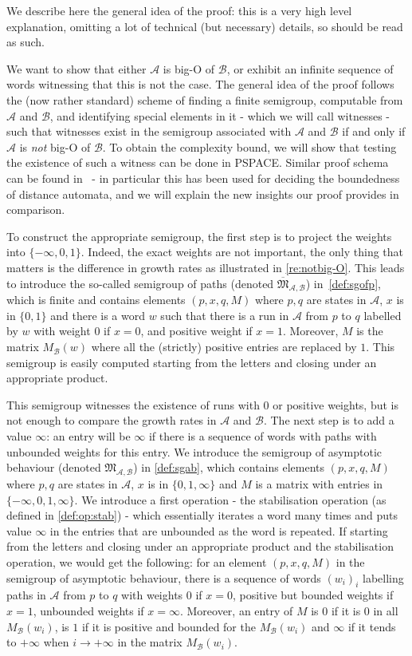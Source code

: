 \documentclass[10pt,a4paper]{amsart}
\theoremstyle{definition}
\numberwithin{equation}{section}
\theoremstyle{remark}
\newcommand{\ideal}{\mathfrak{M}}
\newcommand{\autA}{\mathcal{A}}
\newcommand{\autB}{\mathcal{B}}
\theoremstyle{remark}
\begin{document}
We describe here the general idea of the proof: this is a very high level explanation, omitting a lot of technical (but necessary) details, so should be read as such.

We want to show that either $\autA$ is big-O of $\autB$, or exhibit an infinite sequence of words witnessing that this is not the case. The general idea of the proof follows the (now rather standard) scheme of finding a finite semigroup, computable from $\autA$ and $\autB$, and identifying special elements in it - which we will call witnesses - such that witnesses exist in the semigroup associated with $\autA$ and $\autB$ if and only if  $\autA$ is \emph{not} big-O of $\autB$.
To obtain the complexity bound, we will show that testing the existence of such a witness can be done in PSPACE.
Similar proof schema can be found in~\cite{Simon94,ColcombetD13,ColcombetDZ14} - in particular this has been used for deciding the boundedness of distance automata, and we will explain the new insights our proof provides in comparison.

To construct the appropriate semigroup, the first step is to project the weights into $\{-\infty, 0, 1\}$. Indeed, the exact weights are not important, the only thing that matters is the difference in growth rates as illustrated in \cref{re:notbig-O}. This leads to introduce the so-called semigroup of paths (denoted $\overline{\ideal}_{\autA,\autB}$) in~\cref{def:sgofp}, which is finite and contains elements $(p,x,q,M)$ where $p,q$ are states in $\autA$, $x$ is in $\{0, 1\}$ and there is a word $w$ such that there is a run in $\autA$ from $p$ to $q$ labelled by $w$ with weight $0$ if $x = 0$, and positive weight if $x =1$. Moreover, $M$ is the matrix $M_\autB(w)$ where all the (strictly) positive entries are replaced by $1$. This semigroup is easily computed starting from the letters and closing under an appropriate product.

This semigroup witnesses the existence of runs with $0$ or positive weights, but is not enough to compare the growth rates in $\autA$ and $\autB$. The next step is to add a value $\infty$: an entry will be $\infty$ if there is a sequence of words with paths with unbounded weights for this entry. We introduce the semigroup of asymptotic behaviour (denoted $\ideal_{\autA,\autB}$) in \cref{def:sgab}, which contains elements $(p,x,q,M)$ where $p,q$ are states in $\autA$, $x$ is in $\{0, 1, \infty\}$ and $M$ is a matrix with entries in $\{-\infty, 0, 1, \infty\}$. We introduce a first operation - the stabilisation operation (as defined in \cref{def:op:stab}) - which essentially iterates a word many times and puts value $\infty$ in the entries that are unbounded as the word is repeated. If starting from the letters and closing under an appropriate product and the stabilisation operation, we would get the following: for an element $(p,x,q,M)$ in the semigroup of asymptotic behaviour, there is a sequence of words $(w_i)_i$ labelling paths in $\autA$ from $p$ to $q$ with weights $0$ if $x=0$, positive but bounded weights if $x=1$, unbounded weights if $x=\infty$. Moreover, an entry of $M$ is $0$ if it is $0$ in all $M_\autB(w_i)$, is $1$ if it is positive and bounded for the $M_\autB(w_i)$ and $\infty$ if it tends to $+\infty$ when $i\to +\infty$ in the matrix $M_\autB(w_i)$.
\end{document}
